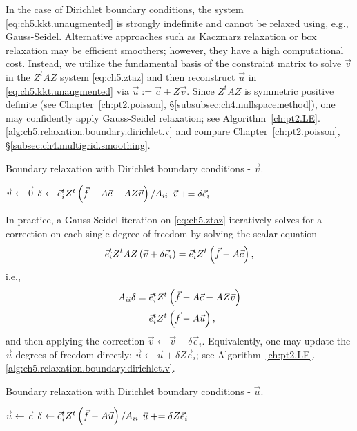 In the case of Dirichlet boundary conditions, the system \eqref{eq:ch5.kkt.unaugmented} is strongly indefinite and cannot be relaxed using, e.g., Gauss-Seidel. Alternative approaches such as Kaczmarz relaxation or box relaxation may be efficient smoothers; however, they have a high computational cost. Instead, we utilize the fundamental basis of the constraint matrix to solve $\vec{v}$ in the $Z^tAZ$ system \eqref{eq:ch5.ztaz} and then reconstruct $\vec{u}$ in \eqref{eq:ch5.kkt.unaugmented} via $\vec{u} := \vec{c} + Z \vec{v}$. Since $Z^tAZ$ is symmetric positive definite (see Chapter~\ref{ch:pt2.poisson}, \S\ref{subsubsec:ch4.nullspacemethod}), one may confidently apply Gauss-Seidel relaxation; see Algorithm~\ref{ch:pt2.LE}.\ref{alg:ch5.relaxation.boundary.dirichlet.v} and compare Chapter~\ref{ch:pt2.poisson}, \S\ref{subsec:ch4.multigrid.smoothing}.

\begin{algorithm}[htbp]
\caption{Boundary relaxation with Dirichlet boundary conditions - $\vec{v}$.}
\label{alg:ch5.relaxation.boundary.dirichlet.v}
\begin{algorithmic}[1]
\STATE $\vec{v} \leftarrow \vec{0}$
    \STATE $\delta \leftarrow \vec{e}_i^t Z^t \left( \vec{f} - A \vec{c} - AZ \vec{v} \right) / A_{ii}$
    \STATE $\vec{v} +{}\!\!\!= \delta \vec{e}_i$
\ENDFOR
\end{algorithmic}
\end{algorithm}

In practice, a Gauss-Seidel iteration on \eqref{eq:ch5.ztaz} iteratively solves for a correction on each single degree of freedom by solving the scalar equation
\begin{equation*}
\vec{e}_i^t Z^tAZ \left( \vec{v} + \delta \vec{e}_i \right) = \vec{e}_i^t Z^t \left( \vec{f} - A \vec{c} \right),
\end{equation*}
i.e.,
\begin{align*}
A_{ii} \delta & = \vec{e}_i^t Z^t \left( \vec{f} - A \vec{c} - A Z \vec{v} \right) \\
              & = \vec{e}_i^t Z^t \left( \vec{f} - A \vec{u} \right),
\end{align*}
and then applying the correction $\vec{v} \leftarrow \vec{v} + \delta \vec{e}_i$. Equivalently, one may update the $\vec{u}$ degrees of freedom directly: $\vec{u} \leftarrow \vec{u} + \delta Z \vec{e}_i$; see Algorithm~\ref{ch:pt2.LE}.\ref{alg:ch5.relaxation.boundary.dirichlet.v}.

\begin{algorithm}[htbp]
\caption{Boundary relaxation with Dirichlet boundary conditions - $\vec{u}$.}
\label{alg:ch5.relaxation.boundary.dirichlet.v}
\begin{algorithmic}[1]
\STATE $\vec{u} \leftarrow \vec{c}$
    \STATE $\delta \leftarrow \vec{e}_i^t Z^t \left( \vec{f} - A \vec{u} \right) / A_{ii}$
    \STATE $\vec{u} +{}\!\!\!= \delta Z \vec{e}_i$
\ENDFOR
\end{algorithmic}
\end{algorithm}

